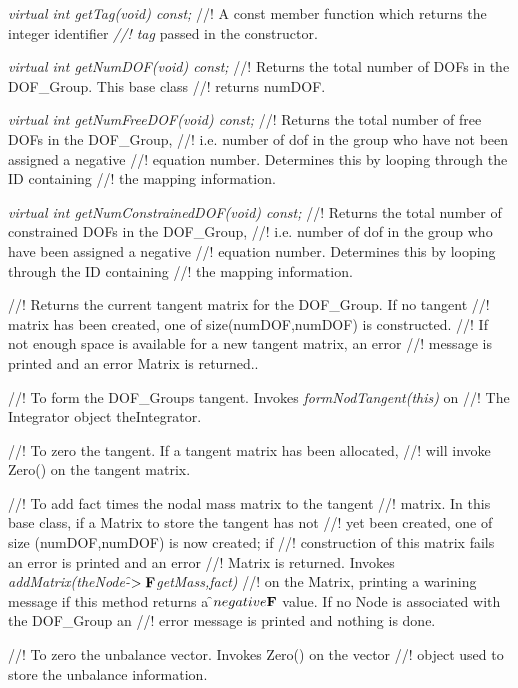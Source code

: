 {\em virtual int getTag(void) const;}
//! A const member function which returns the integer identifier {\em
//! tag} passed in the constructor.

{\em virtual int getNumDOF(void) const;}
//! Returns the total number of DOFs in the DOF\_Group. This base class
//! returns \p numDOF.

{\em virtual int getNumFreeDOF(void) const;}
//! Returns the total number of \p free DOFs in the DOF\_Group,
//! i.e. number of dof in the group who have not been assigned a negative
//! equation number. Determines this by looping through the ID containing
//! the mapping information.

{\em virtual int getNumConstrainedDOF(void) const;}
//! Returns the total number of \p constrained DOFs in the DOF\_Group,
//! i.e. number of dof in the group who have been assigned a negative
//! equation number. Determines this by looping through the ID containing
//! the mapping information.


//! Returns the current tangent matrix for the DOF\_Group. If no tangent
//! matrix has been created, one of size(numDOF,numDOF) is constructed.
//! If not enough space is available for a new tangent matrix, an error
//! message is printed and an error Matrix is returned..  

//! To form the DOF\_Groups tangent. Invokes {\em formNodTangent(this)} on
//! The Integrator object \p theIntegrator.

//! To zero the tangent. If a tangent matrix has been allocated,
//! will invoke Zero() on the tangent matrix.

//! To add \p fact times the nodal mass matrix to the tangent
//! matrix. In this base class, if a Matrix to store the tangent has not
//! yet been created, one of size (numDOF,numDOF) is now created; if
//! construction of this matrix fails an error is printed and an error
//! Matrix is returned. Invokes {\em addMatrix(theNode-\f$>{\bf F}$getMass,fact)}
//! on the Matrix, printing a warining message if this method returns a
\f$negative{\bf F}$ value. If no Node is associated with the DOF\_Group an
//! error message is printed and nothing is done.

//! To zero the unbalance vector. Invokes Zero() on the vector
//! object used to store the unbalance information.

